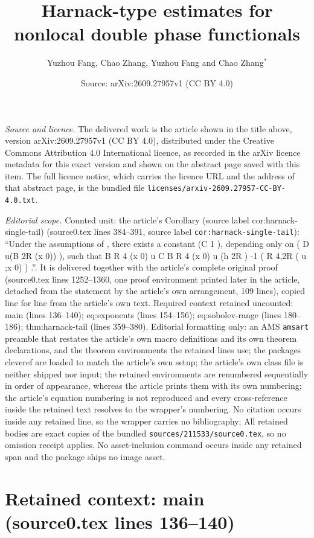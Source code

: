 \documentclass[10pt,a4paper]{amsart}
\title[Harnack-type estimates for nonlocal double phase functionals]{Harnack-type estimates for nonlocal double phase functionals}
\author{Yuzhou Fang, Chao Zhang, Yuzhou Fang and Chao Zhang$^*$}
\date{Source: arXiv:2609.27957v1 (CC BY 4.0)}
\theoremstyle{plain}
\theoremstyle{definition}
\theoremstyle{remark}
\begin{document}
\maketitle

\noindent\emph{Source and licence.} The delivered work is the article shown in the title above, version arXiv:2609.27957v1 (CC BY 4.0), distributed under the Creative Commons Attribution 4.0 International licence, as recorded in the arXiv licence metadata for this exact version and shown on the abstract page saved with this item. The full licence notice, which carries the licence URL and the address of that abstract page, is the bundled file \texttt{licenses/arxiv-2609.27957-CC-BY-4.0.txt}.
\par\smallskip

\noindent\textit{Editorial scope.} Counted unit: the article's Corollary (source label cor:harnack-single-tail) (source0.tex lines 384--391, source label \texttt{cor:harnack-single-tail}): ``Under the assumptions of , there exists a constant (C 1 ), depending only on ( D u(B 2R (x 0)) ), such that B R 4 (x 0) u C B R 4 (x 0) u (h 2R ) -1 ( R 4,2R ( u ;x 0) ) .''. It is delivered together with the article's complete original proof (source0.tex lines 1252--1360, one proof environment printed later in the article, detached from the statement by the article's own arrangement, 109 lines), copied line for line from the article's own text. Required context retained uncounted: main (lines 136--140); eq:exponents (lines 154--156); eq:sobolev-range (lines 180--186); thm:harnack-tail (lines 359--380). Editorial formatting only: an AMS \texttt{amsart} preamble that restates the article's own macro definitions and its own theorem declarations, and the theorem environments the retained lines use; the packages cleveref are loaded to match the article's own setup; the article's own class file is neither shipped nor input; the retained environments are renumbered sequentially in order of appearance, whereas the article prints them with its own numbering; the article's equation numbering is not reproduced and every cross-reference inside the retained text resolves to the wrapper's numbering. No citation occurs inside any retained line, so the wrapper carries no bibliography; All retained bodies are exact copies of the bundled \texttt{sources/211533/source0.tex}, so no omission receipt applies. No asset-inclusion command occurs inside any retained span and the package ships no image asset.


\section*{Retained context: main (source0.tex lines 136--140)}
\end{document}
